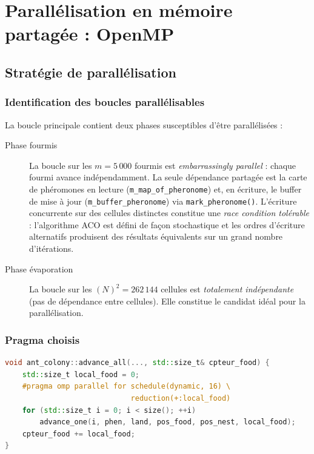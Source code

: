 \chapter{Parallélisation en mémoire partagée : OpenMP}
\label{chap:openmp}

\section{Stratégie de parallélisation}

\subsection{Identification des boucles parallélisables}

La boucle principale contient deux phases susceptibles d'être parallélisées :

\begin{description}
    \item[Phase fourmis] La boucle sur les $m = 5\,000$ fourmis est \emph{embarrassingly
          parallel} : chaque fourmi avance indépendamment. La seule dépendance partagée
          est la carte de phéromones en lecture (\texttt{m\_map\_of\_pheronome}) et,
          en écriture, le buffer de mise à jour (\texttt{m\_buffer\_pheronome}) via
          \texttt{mark\_pheronome()}. L'écriture concurrente sur des cellules distinctes
          constitue une \emph{race condition tolérable} : l'algorithme ACO est défini
          de façon stochastique et les ordres d'écriture alternatifs produisent des
          résultats équivalents sur un grand nombre d'itérations.
    \item[Phase évaporation] La boucle sur les $(N)^2 = 262\,144$ cellules est
          \emph{totalement indépendante} (pas de dépendance entre cellules).
          Elle constitue le candidat idéal pour la parallélisation.
\end{description}

\subsection{Pragma choisis}

\begin{lstlisting}[language=C++, caption={OpenMP sur la boucle fourmis (ant.cpp)}]
void ant_colony::advance_all(..., std::size_t& cpteur_food) {
    std::size_t local_food = 0;
    #pragma omp parallel for schedule(dynamic, 16) \
                             reduction(+:local_food)
    for (std::size_t i = 0; i < size(); ++i)
        advance_one(i, phen, land, pos_food, pos_nest, local_food);
    cpteur_food += local_food;
}
\end{lstlisting}

